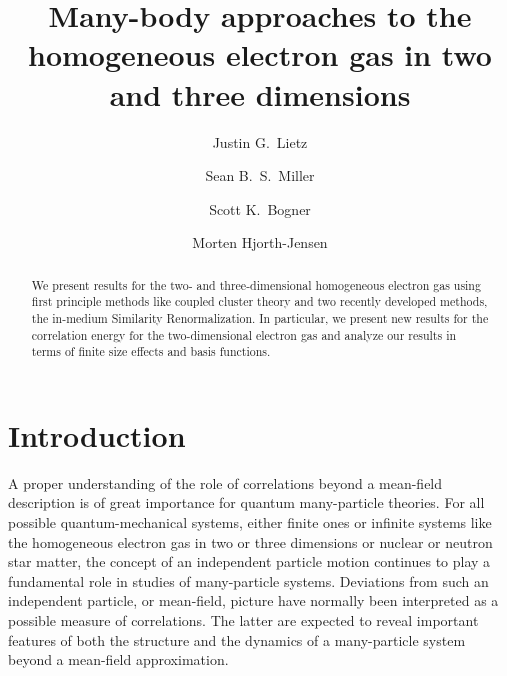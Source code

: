 \documentclass[aps,twocolumn,showpacs,floatfix,nofootinbib,preprintnumbers,superscriptaddress,amsmath,amssymb]{revtex4-1}
\begin{document}
\title{Many-body approaches to the homogeneous electron gas in two and three dimensions} 


\author{Justin G.~Lietz}

\author{Sean B.~S.~Miller}

\author{Scott K.~Bogner}

\author{Morten Hjorth-Jensen} 

\begin{abstract} 
We present results for the two- and three-dimensional homogeneous
electron gas using first principle methods like coupled cluster
theory and two recently developed methods, the in-medium Similarity Renormalization. In particular, we present
new results for the correlation energy for the two-dimensional
electron gas and analyze our results in terms of finite size effects and basis functions.
\end{abstract}


\maketitle

\section{Introduction}
A proper understanding of the role of correlations beyond a mean-field
description is of great importance for quantum many-particle
theories. For all possible quantum-mechanical systems, either finite
ones or infinite systems like the homogeneous electron gas in two or
three dimensions or nuclear or neutron star matter, the concept of an
independent particle motion continues to play a fundamental role in
studies of many-particle systems.  Deviations from such an independent
particle, or mean-field, picture have normally been interpreted as a
possible measure of correlations.  The latter are expected to reveal
important features of both the structure and the dynamics of a
many-particle system beyond a mean-field approximation.
\end{document}
